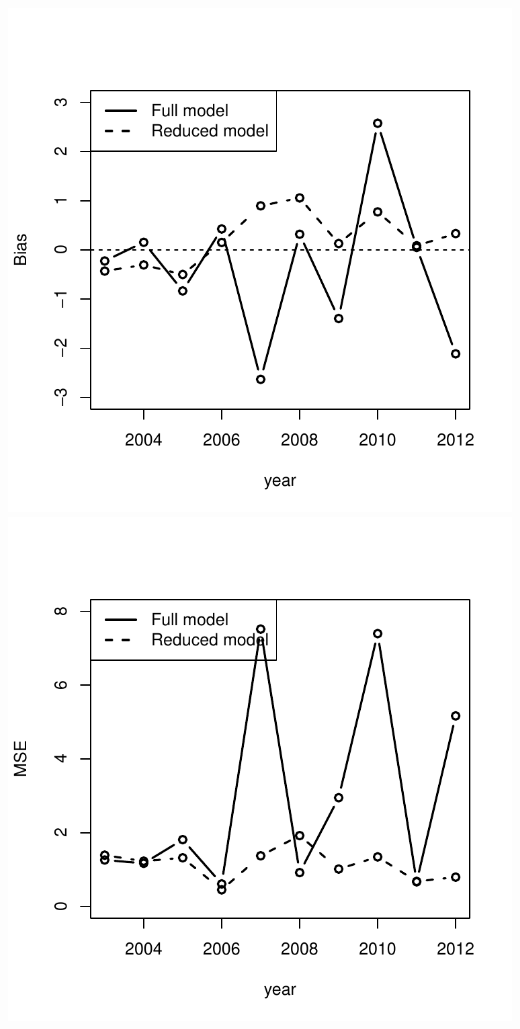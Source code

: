 \documentclass[landscape,a0paper,fontscale=0.3]{baposter} %
\begin{document}
\begin{poster}
{\vspace{-2em}
\begin{minipage}[b]{.25\textwidth}
\vspace{1em}
\begin{center}
\includegraphics[width=1\linewidth]{rolling_predbias_full_vs_reduced}\\
\includegraphics[width=1\linewidth]{rolling_predMSE_full_vs_reduced}\\

\end{center}
\end{minipage}}
\end{poster}
\end{document}
